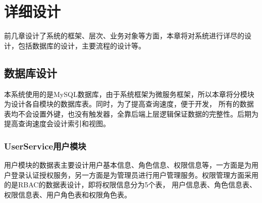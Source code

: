 \chapter{详细设计}
前几章设计了系统的框架、层次、业务对象等方面，本章将对系统进行详尽的设计，包括数据库的设计，主要流程的设计等。
\section{数据库设计}
本系统使用的是MySQL数据库，由于系统框架为微服务框架，所以本章将分模块为设计各自模块的数据库表。同时，为了提高查询速度，便于开发，
所有的数据表均不会设置外键，也没有触发器，全靠后端上层逻辑保证数据的完整性。后期为提高查询速度会设计索引和视图。
\subsection{UserService用户模块}
用户模块的数据表主要设计用户基本信息、角色信息、权限信息等，一方面是为用户登录认证授权服务，另一方面是为管理员进行用户管理服务。权限管理方面采用的是RBAC的数据表设计，即将权限信息分为5个表，
用户信息表、角色信息表、权限信息表、用户角色表和权限角色表。
